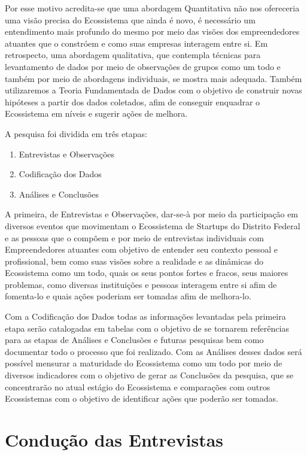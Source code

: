 Por esse motivo acredita-se que uma abordagem Quantitativa não nos ofereceria uma visão precisa do Ecossistema que ainda é novo, é necessário um entendimento mais profundo do mesmo por meio das
visões dos empreendedores atuantes que o constróem e como suas empresas interagem entre si. Em retrospecto, uma abordagem qualitativa, que contempla técnicas para levantamento de dados por meio
de observações de grupos como um todo e também por meio de abordagens individuais, se mostra mais adequada. Também utilizaremos a Teoria Fundamentada de Dados com o objetivo de construir novas hipóteses a partir dos dados coletados, afim de conseguir enquadrar o Ecossistema em níveis e sugerir ações
de melhora.

A pesquisa foi dividida em três etapas:

\begin{enumerate}
  \item Entrevistas e Observações
  \item Codificação dos Dados
  \item Análises e Conclusões
\end{enumerate}

A primeira, de Entrevistas e Observações, dar-se-à por meio da participação em diversos eventos que movimentam o Ecossistema de Startups do Distrito Federal e as pessoas que o compõem e por meio
de entrevistas individuais com Empreendedores atuantes com objetivo de entender seu contexto pessoal e profissional, bem como suas visões sobre a realidade e as dinâmicas do Ecossistema como um todo,
quais os seus pontos fortes e fracos, seus maiores problemas, como diversas instituições e pessoas interagem entre si afim de fomenta-lo e quais ações poderiam ser tomadas afim de melhora-lo.

Com a Codificação dos Dados todas as informações levantadas pela primeira etapa serão catalogadas em tabelas com o objetivo de se tornarem referências para as etapas de Análises e Conclusões e
futuras pesquisas bem como documentar todo o processo que foi realizado. Com as Análises desses dados será possível mensurar a maturidade do Ecossistema como um todo por meio de diversos indicadores
com o objetivo de gerar as Conclusões da pesquisa, que se concentrarão no atual estágio do Ecossistema e comparações com outros Ecossistemas com o objetivo de identificar ações que poderão ser tomadas.

\section{Condução das Entrevistas}
\label{section:conducao_das_entrevistas}


